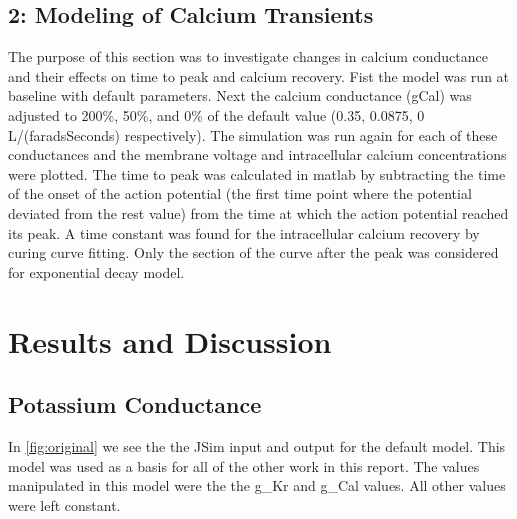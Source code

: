 \documentclass[11pt]{article}
\begin{document}
\subsection{2: Modeling of Calcium Transients}
\par{}
The purpose of this section was to investigate changes in calcium conductance and their effects on time to peak and calcium recovery. Fist the model was run at baseline with default parameters. Next the calcium conductance (gCal) was adjusted to 200\%, 50\%, and 0\% of the default value (0.35, 0.0875, 0
L/(faradsSeconds) respectively). The simulation was run again for each of these conductances and the membrane voltage and intracellular calcium concentrations were plotted. The time to peak was calculated in matlab by subtracting the time of the onset of the action potential (the first time point where the potential deviated from the rest value) from the time at which the action potential reached its peak. A time constant was found for the intracellular calcium recovery by curing curve fitting. Only the section of the curve after the peak was considered for exponential decay model.

\section{Results and Discussion}
\subsection{Potassium Conductance}
\par{}
In \ref{fig:original} we see the the JSim input and output for the default model. This model was used as a basis for all of the other work in this report. The values manipulated in this model were the the g\_Kr and g\_Cal values. All other values were left constant.
\end{document}
